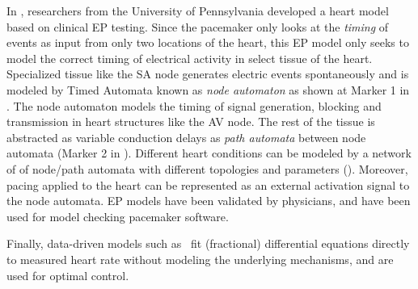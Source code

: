 In \cite{VHM_proc}, researchers from the University of Pennsylvania developed a heart model based on clinical EP testing. 
Since the pacemaker only looks at the \emph{timing} of events as input from only two locations of the heart, this EP model only seeks to model the correct timing of electrical activity in select tissue of the heart.
Specialized tissue like the SA node generates electric events spontaneously and is modeled by Timed Automata known as \emph{node automaton} as shown at Marker 1 in .
The node automaton models the timing of signal generation, blocking and transmission in heart structures like the AV node. 
The rest of the tissue is abstracted as variable conduction delays as \emph{path automata} between node automata (Marker 2 in ).
Different heart conditions can be modeled by a network of of node/path automata with different  topologies and parameters ().
Moreover, pacing applied to the heart can be represented as an external activation signal to the node automata.
EP models have been validated by physicians, and have been used for model checking pacemaker software. 

Finally, data-driven models such as~\cite{Bogdan12_fractional} fit (fractional) differential equations directly to measured heart rate without modeling the underlying mechanisms, and are used for optimal control.
